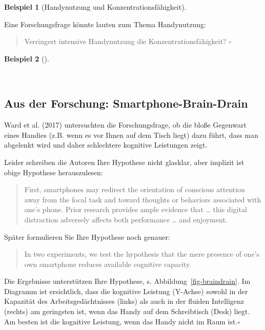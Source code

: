\documentclass[
  a4paper,
]{scrbook}
\theoremstyle{definition}
\newtheorem{example}{Beispiel}[chapter]
\theoremstyle{definition}
\theoremstyle{definition}
\theoremstyle{remark}
\begin{document}
\begin{example}[Handynutzung und
Konzentrationsfähigkeit]\protect\hypertarget{exm-braindrain}{}\label{exm-braindrain}

Eine Forschungsfrage könnte lauten zum Thema Handynutzung:

\begin{quote}
Verringert intensive Handynutzung die Konzentrationsfähigkeit?
\(\square\)
\end{quote}

\end{example}

\begin{example}[]\protect\hypertarget{exm-braindrain2}{}\label{exm-braindrain2}

~

\subsection{Aus der Forschung:
Smartphone-Brain-Drain}\label{aus-der-forschung-smartphone-brain-drain-1}

Ward et al. (2017) untersuchten die Forschungsfrage, ob die bloße
Gegenwart eines Handies (z.B. wenn es vor Ihnen auf dem Tisch liegt)
dazu führt, dass man abgelenkt wird und daher schlechtere kognitive
Leistungen zeigt.

Leider schreiben die Autoren Ihre Hypothese nicht glasklar, aber
implizit ist obige Hypothese herauszulesen:

\begin{quote}
First, smartphones may redirect the orientation of conscious attention
away from the focal task and toward thoughts or behaviors associated
with one's phone. Prior research provides ample evidence that \ldots{}
this digital distraction adversely affects both performance \ldots{} and
enjoyment.
\end{quote}

Später formulieren Sie Ihre Hypothese noch genauer:

\begin{quote}
In two experiments, we test the hypothesis that the mere presence of
one's own smartphone reduces available cognitive capacity.
\end{quote}

Die Ergebnisse unterstützen Ihre Hypothese, s.
Abbildung~\ref{fig-braindrain}. Im Diagramm ist ersichtlich, dass die
kognitive Leistung (Y-Achse) sowohl in der Kapazität des
Arbeitsgedächtnisses (links) als auch in der fluiden Intelligenz
(rechts) am geringsten ist, wenn das Handy auf dem Schreibtisch (Desk)
liegt. Am besten ist die kognitive Leistung, wenn das Handy nicht im
Raum ist.\(\square\)


\end{example}
\end{document}
